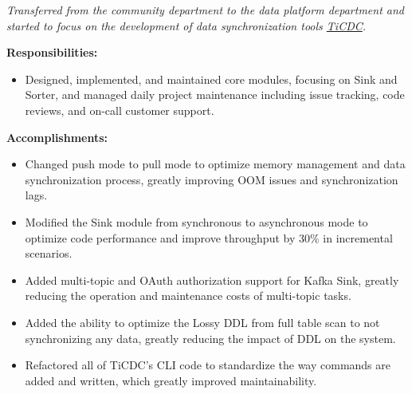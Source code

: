 \documentclass{software_engineer_rustin_liu}
\newcommand{\en}[1]{#1}
\newcommand{\zh}[1]{}
\begin{document}
\en{}
\zh{\datedsubsection{\textbf{\href{https://pingcap.com/zh/}{PingCAP Inc. - 数据库 - 数据库工具研发（Golang/Rust）}}}{2021/07 -- 2023/07}}
\en{\textsl{Transferred from the community department to the data platform department and started to focus on the development of data synchronization tools {\href{https://github.com/pingcap/tiflow}{TiCDC}}.}}
\zh{\textsl{从社区部门转组到数据平台部门，开始专注于数据同步工具 {\href{https://github.com/pingcap/tiflow}{TiCDC} 的研发。}}}

\en{\textbf{Responsibilities:}}
\zh{\textbf{职责：}}
\begin{itemize}
      \item \en{Designed, implemented, and maintained core modules, focusing on Sink and Sorter, and managed daily project maintenance including issue tracking, code reviews, and on-call customer support.}
            \zh{设计、实现和维护核心模块，专注于 Sink 和 Sorter，管理项目日常维护，包括 issue 追踪、代码审阅和 on-call 客户支持。}
\end{itemize}

\en{\textbf{Accomplishments:}}
\zh{\textbf{产出：}}
\begin{itemize}
      \item \en{Changed push mode to pull mode to optimize memory management and data synchronization process, greatly improving OOM issues and synchronization lags.}
            \zh{将推送模式修改为了拉取模式优化了内存管理和数据同步流程，极大的改善了 OOM 问题和同步延迟。}
      \item \en{Modified the Sink module from synchronous to asynchronous mode to optimize code performance and improve throughput by 30\% in incremental scenarios.}
            \zh{将 Sink 模块从同步模式修改为异步模式，优化代码性能，将增量场景下吞吐提升 30\%。}
      \item \en{ Added multi-topic and OAuth authorization support for Kafka Sink, greatly reducing the operation and maintenance costs of multi-topic tasks.}
            \zh{为 Kafka Sink 支持了多 Topic 和 OAuth 授权功能，极大的降低了多 Topic 的任务运维成本。}
      \item \en{Added the ability to optimize the Lossy DDL from full table scan to not synchronizing any data, greatly reducing the impact of DDL on the system.}
            \zh{将有损 DDL 从全表扫描优化为不同步任何数据，极大的降低了有损 DDL 对系统的影响。}
      \item \en{Refactored all of TiCDC's CLI code to standardize the way commands are added and written, which greatly improved maintainability.}
            \zh{重构了 TiCDC 的 CLI 所有代码，标准化了命令添加和编写方式，极大提升了可维护性。}
\end{itemize}
\end{document}
